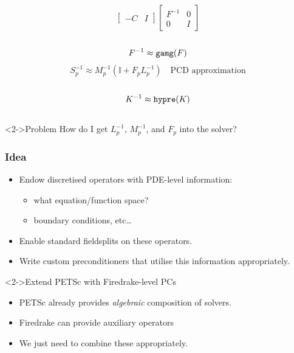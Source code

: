 \documentclass[presentation,aspectratio=43]{beamer}
\begin{document}
\begin{frame}[fragile,t]
\begin{columns}[t]
\begin{column}{0.49\textwidth}
{\begin{equation*}
\begin{bmatrix}
          -C & I
        \end{bmatrix}
        \begin{bmatrix}
          F^{-1} & 0 \\
          0 & I
        \end{bmatrix}
      \end{equation*}
      \\[0.5\baselineskip]
      \begin{equation*}
        F^{-1} \approx \text{\texttt{gamg}}(F)
      \end{equation*}
      \begin{equation*}
        S_p^{-1} \approx M_p^{-1}(\mathbb{I} + F_p L_p^{-1})\quad\text{PCD approximation}
      \end{equation*}
      \\[0.5\baselineskip]
      \begin{equation*}
        K^{-1} \approx \text{\texttt{hypre}}(K)
      \end{equation*}
      }
    \end{column}
  \end{columns}

  \begin{alertblock}<2->{Problem}
    How do I get $L_p^{-1}$, $M_p^{-1}$, and $F_p$ into the solver?
  \end{alertblock}
\end{frame}

\begin{frame}
  \frametitle{Idea}
  \begin{itemize}
  \item Endow discretised operators with PDE-level information:
    \begin{itemize}
    \item what equation/function space?
    \item boundary conditions, etc\ldots
    \end{itemize}
  \item Enable standard fieldsplits on these operators.
  \item Write custom preconditioners that utilise this information appropriately.
  \end{itemize}
  \begin{block}<2->{Extend PETSc with Firedrake-level PCs}
  \begin{itemize}
  \item PETSc already provides \emph{algebraic} composition of solvers. \nocite{Brown:2012}

  \item Firedrake can provide auxiliary operators

  \item We just need to combine these appropriately.
  \end{itemize}
  \end{block}
\end{frame}
\end{document}

